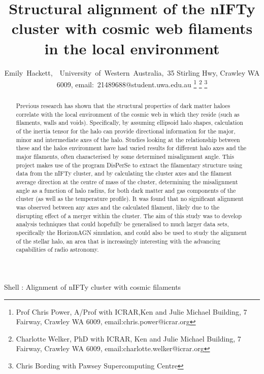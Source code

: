 \documentclass[journal]{IEEEtran}
\begin{document}
\title{Structural alignment of the nIFTy cluster with cosmic web filaments in the local environment}
\author{Emily~Hackett,~~University~of~Western~Australia,~35 Stirling Hwy, Crawley WA 6009, email:~21489688@student.uwa.edu.au 
	\thanks{Prof Chris Power, A/Prof with ICRAR,Ken and Julie Michael Building, 7 Fairway, Crawley WA 6009, email:chris.power@icrar.org}%
	\thanks{Charlotte Welker, PhD with ICRAR, Ken and Julie Michael Building, 7 Fairway, Crawley WA 6009, email:charlotte.welker@icrar.org}%
	\thanks{Chris Bording with Pawsey Supercomputing Centre}}

%
{Shell \MakeLowercase{}: Alignment of nIFTy cluster with cosmic filaments}

\maketitle

\begin{abstract}
	Previous research has shown that the structural properties of dark matter haloes correlate with the local environment of the cosmic web in which they reside (such as filaments, walls and voids). Specifically, by assuming ellipsoid halo shapes, calculation of the inertia tensor for the halo can provide directional information for the major, minor and intermediate axes of the halo. Studies looking at the relationship between these and the halos environment have had varied results for different halo axes and the major filaments, often characterised by some determined misalignment angle. This project makes use of the program DisPerSe to extract the filamentary structure using data from the nIFTy cluster, and by calculating the cluster axes and the filament average direction at the centre of mass of the cluster, determining the misalignment angle as a function of halo radius, for both dark matter and gas components of the cluster (as well as the temperature profile). It was found that no significant alignment was observed between any axes and the calculated filament, likely due to the disrupting effect of a merger within the cluster. The aim of this study was to develop analysis techniques that could hopefully be generalised to much larger data sets, specifically the HorizonAGN simulation, and could also be used to study the alignment of the stellar halo, an area that is increasingly interesting with the advancing capabilities of radio astronomy. 
\end{abstract}
\end{document}
